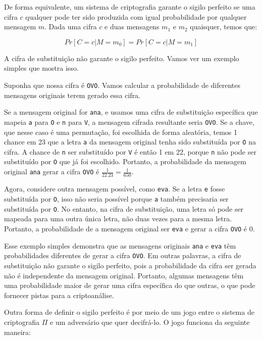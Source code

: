 De forma equivalente, um sistema de criptografia garante o sigilo perfeito se uma cifra $c$ qualquer pode ter sido produzida com igual probabilidade por qualquer mensagem $m$.
Dada uma cifra $c$ e duas mensagens $m_1$ e $m_2$ quaisquer, temos que:

\begin{displaymath}
  Pr[C = c | M = m_0] = Pr[C = c | M = m_1]
\end{displaymath}


A cifra de substituição não garante o sigilo perfeito.
Vamos ver um exemplo simples que mostra isso.

\begin{example}
  Suponha que nossa cifra é {\tt OVO}.
  Vamos calcular a probabilidade de diferentes mensagens originais terem gerado essa cifra.

  Se a mensagem original for {\tt ana}, e usamos uma cifra de substituição específica que mapeia {\tt a} para {\tt O} e {\tt n} para {\tt V}, a mensagem cifrada resultante seria {\tt OVO}.
  Se a chave, que nesse caso é uma permutação, foi escolhida de forma aleatória, temos 1 chance em 23 que a letra {\tt a} da mensagem original tenha sido substituída por {\tt O} na cifra.
  A chance de {\tt n} ser substituído por {\tt V} é então 1 em 22, porque {\tt n} não pode ser substituído por {\tt O} que já foi escolhido.
  Portanto, a probabilidade da mensagem original {\tt ana} gerar a cifra {\tt OVO} é $\frac{1}{22.23} = \frac{1}{650}$.

  Agora, considere outra mensagem possível, como {\tt eva}.
  Se a letra {\tt e} fosse substituída por {\tt O}, isso não seria possível porque {\tt a} também precisaria ser substituída por {\tt O}.
  No entanto, na cifra de substituição, uma letra só pode ser mapeada para uma outra única letra, não duas vezes para a mesma letra.
  Portanto, a probabilidade de a mensagem original ser {\tt eva} e gerar a cifra {\tt OVO} é 0.

\end{example}
  
Esse exemplo simples demonstra que as mensagens originais {\tt ana} e {\tt eva} têm probabilidades diferentes de gerar a cifra {\tt OVO}.
Em outras palavras, a cifra de substituição não garante o sigilo perfeito, pois a probabilidade da cifra ser gerada não é independente da mensagem original.
Portanto, algumas mensagens têm uma probabilidade maior de gerar uma cifra específica do que outras, o que pode fornecer pistas para a criptoanálise.

Outra forma de definir o sigilo perfeito é por meio de um jogo entre o sistema de criptografia $\Pi$ e um adversário que quer decifrá-lo.
O jogo funciona da seguinte maneira:

